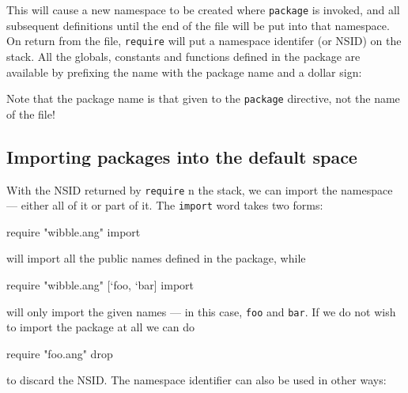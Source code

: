 This will cause a new namespace to be created where \texttt{package} is 
invoked, and all subsequent definitions until the end of the file will
be put into that namespace. On return from the file, \texttt{require} will
put a namespace identifer (or NSID) on the stack. All the globals,
constants and functions defined in the package are available by prefixing
the name with the package name and a dollar sign:
Note that the package name is that given to the \texttt{package} directive,
not the name of the file!

\subsection{Importing packages into the default space}
With the NSID returned by \texttt{require} 
n the stack, we can import the namespace --- either
all of it or part of it. The \texttt{import} word takes two forms:
\begin{v}
require "wibble.ang" import
\end{v}
will import all the public names defined in the package, while
\begin{v}
require "wibble.ang" [`foo, `bar] import
\end{v}
will only import the given names --- in this case, \texttt{foo} and \texttt{bar}. If we do not wish
to import the package at all we can do
\begin{v}
require "foo.ang" drop
\end{v}
to discard the NSID.
The namespace identifier can also be used in other ways:

